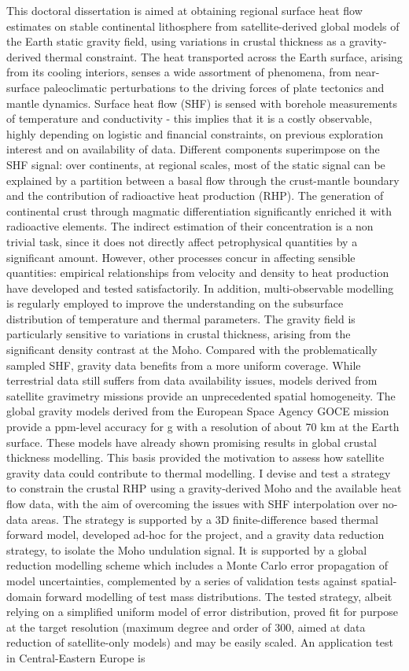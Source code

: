 This doctoral dissertation is aimed at obtaining regional surface heat flow estimates on stable continental lithosphere from satellite-derived global models of the Earth static gravity field, using variations in crustal thickness as a gravity-derived thermal constraint. The heat transported across the Earth surface, arising from its cooling interiors, senses a wide assortment of phenomena, from near-surface paleoclimatic perturbations to the driving forces of plate tectonics and mantle dynamics. Surface heat flow (SHF) is sensed with borehole measurements of temperature and conductivity - this implies that it is a costly observable, highly depending on logistic and financial constraints, on previous exploration interest and on availability of data. Different components superimpose on the SHF signal: over continents, at regional scales, most of the static signal can be explained by a partition between a basal flow through the crust-mantle boundary and the contribution of radioactive heat production (RHP). The generation of continental crust through magmatic differentiation significantly enriched it with radioactive elements. The indirect estimation of their concentration is a non trivial task, since it does not directly affect petrophysical quantities by a significant amount. However, other processes concur in affecting sensible quantities: empirical relationships from velocity and density to heat production have developed and tested satisfactorily. In addition, multi-observable modelling is regularly employed to improve the understanding on the subsurface distribution of temperature and thermal parameters. The gravity field is particularly sensitive to variations in crustal thickness, arising from the significant density contrast at the Moho. Compared with the problematically sampled SHF, gravity data benefits from a more uniform coverage. While terrestrial data still suffers from data availability issues, models derived from satellite gravimetry missions provide an unprecedented spatial homogeneity. The global gravity models derived from the European Space Agency GOCE mission provide a ppm-level accuracy for g with a resolution of about 70 km at the Earth surface. These models have already shown promising results in global crustal thickness modelling. This basis provided the motivation to assess how satellite gravity data could contribute to thermal modelling. I devise and test a strategy to constrain the crustal RHP using a gravity-derived Moho and the available heat flow data, with the aim of overcoming the issues with SHF interpolation over no-data areas. The strategy is supported by a 3D finite-difference based thermal forward model, developed ad-hoc for the project, and a gravity data reduction strategy, to isolate the Moho undulation signal. It is supported by a global reduction modelling scheme which includes a Monte Carlo error propagation of model uncertainties, complemented by a series of validation tests against spatial-domain forward modelling of test mass distributions. The tested strategy, albeit relying on a simplified uniform model of error distribution, proved fit for purpose at the target resolution (maximum degree and order of 300, aimed at data reduction of satellite-only models) and may be easily scaled. An application test in Central-Eastern Europe is 